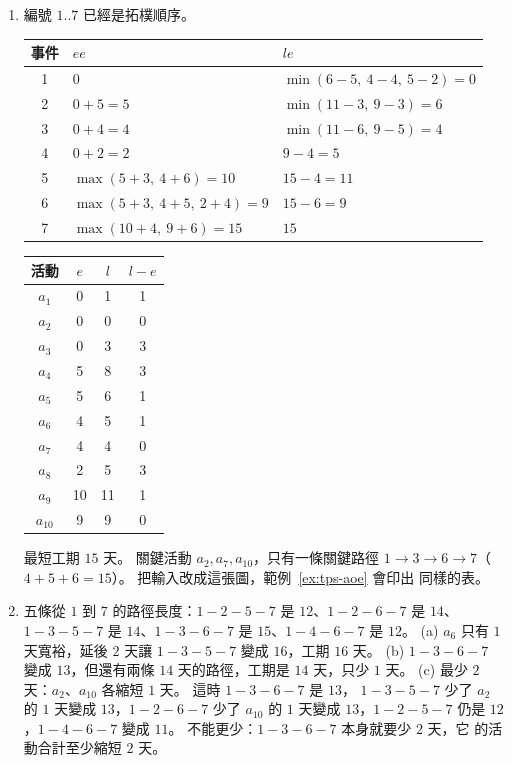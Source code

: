 \begin{enumerate}
\item 編號 $1..7$ 已經是拓樸順序。
\begin{center}
\begin{tabular}{cll}
\toprule
事件 & $\mathit{ee}$ & $\mathit{le}$ \\
\midrule
1 & 0 & $\min(6 - 5,\ 4 - 4,\ 5 - 2) = 0$ \\
2 & $0 + 5 = 5$ & $\min(11 - 3,\ 9 - 3) = 6$ \\
3 & $0 + 4 = 4$ & $\min(11 - 6,\ 9 - 5) = 4$ \\
4 & $0 + 2 = 2$ & $9 - 4 = 5$ \\
5 & $\max(5 + 3,\ 4 + 6) = 10$ & $15 - 4 = 11$ \\
6 & $\max(5 + 3,\ 4 + 5,\ 2 + 4) = 9$ & $15 - 6 = 9$ \\
7 & $\max(10 + 4,\ 9 + 6) = 15$ & $15$ \\
\bottomrule
\end{tabular}
\qquad
\begin{tabular}{cccc}
\toprule
活動 & $e$ & $l$ & $l - e$ \\
\midrule
$a_1$ & 0 & 1 & 1 \\
$a_2$ & 0 & 0 & 0 \\
$a_3$ & 0 & 3 & 3 \\
$a_4$ & 5 & 8 & 3 \\
$a_5$ & 5 & 6 & 1 \\
$a_6$ & 4 & 5 & 1 \\
$a_7$ & 4 & 4 & 0 \\
$a_8$ & 2 & 5 & 3 \\
$a_9$ & 10 & 11 & 1 \\
$a_{10}$ & 9 & 9 & 0 \\
\bottomrule
\end{tabular}
\end{center}
最短工期 $15$ 天。 關鍵活動 $a_2, a_7, a_{10}$，只有一條關鍵路徑
$1 \to 3 \to 6 \to 7$（$4 + 5 + 6 = 15$）。 把輸入改成這張圖，範例~\ref{ex:tps-aoe} 會印出
同樣的表。

\item 五條從 $1$ 到 $7$ 的路徑長度：$1\!-\!2\!-\!5\!-\!7$ 是 $12$、$1\!-\!2\!-\!6\!-\!7$ 是
$14$、$1\!-\!3\!-\!5\!-\!7$ 是 $14$、$1\!-\!3\!-\!6\!-\!7$ 是 $15$、$1\!-\!4\!-\!6\!-\!7$ 是
$12$。
(a) $a_6$ 只有 $1$ 天寬裕，延後 $2$ 天讓 $1\!-\!3\!-\!5\!-\!7$ 變成 $16$，工期 $16$ 天。
(b) $1\!-\!3\!-\!6\!-\!7$ 變成 $13$，但還有兩條 $14$ 天的路徑，工期是 $14$ 天，只少 $1$ 天。
(c) 最少 $2$ 天：$a_2$、$a_{10}$ 各縮短 $1$ 天。 這時 $1\!-\!3\!-\!6\!-\!7$ 是 $13$，
$1\!-\!3\!-\!5\!-\!7$ 少了 $a_2$ 的 $1$ 天變成 $13$，$1\!-\!2\!-\!6\!-\!7$ 少了 $a_{10}$ 的
$1$ 天變成 $13$，$1\!-\!2\!-\!5\!-\!7$ 仍是 $12$，$1\!-\!4\!-\!6\!-\!7$ 變成 $11$。 不能更少：$1\!-\!3\!-\!6\!-\!7$ 本身就要少 $2$ 天，它
的活動合計至少縮短 $2$ 天。


\end{enumerate}
